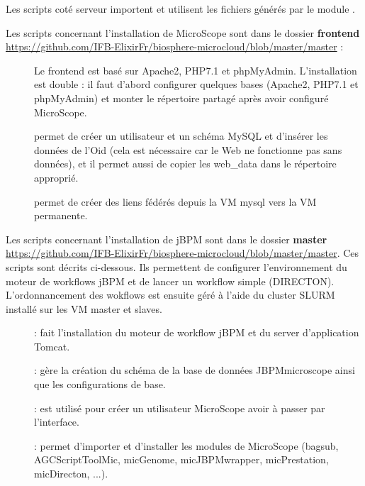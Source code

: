 Les scripts coté serveur importent et utilisent les fichiers générés par le module \micWEBdeployVer.

Les scripts concernant l'installation de MicroScope sont dans le dossier \textbf{frontend} \url{https://github.com/IFB-ElixirFr/biosphere-microcloud/blob/master/master} :
\begin{description}
    \item[] Le frontend est basé sur Apache2, PHP7.1 et phpMyAdmin. L'installation est double : il faut d'abord configurer quelques bases (Apache2, PHP7.1 et phpMyAdmin) et monter le répertoire partagé après avoir configuré MicroScope.
    \item[] permet de créer un utilisateur et un schéma MySQL et d'insérer les données de l'Oid \theOid{} (cela est nécessaire car le Web ne fonctionne pas sans données), et il permet aussi de copier les web\_data dans le répertoire approprié.
    \item[] permet de créer des liens fédérés depuis la VM mysql vers la VM permanente.
\end{description}

Les scripts concernant l'installation de jBPM sont dans le dossier \textbf{master} \url{https://github.com/IFB-ElixirFr/biosphere-microcloud/blob/master/master}. Ces scripts sont décrits ci-dessous. Ils permettent de configurer l'environnement du moteur de workflows jBPM et de lancer un workflow simple (DIRECTON). L'ordonnancement des wokflows est ensuite géré à l'aide du cluster SLURM installé sur les VM master et slaves.

\begin{description}
    \item[] : fait l'installation du moteur de workflow jBPM et du server d'application Tomcat.
    \item[] : gère la création du schéma de la base de données JBPMmicroscope ainsi que les configurations de base.
    \item[] : est utilisé pour créer un utilisateur MicroScope avoir à passer par l'interface.
    \item[] : permet d'importer et d'installer les modules de MicroScope (bagsub, AGCScriptToolMic, micGenome, micJBPMwrapper, micPrestation, micDirecton, ...).
\end{description}
